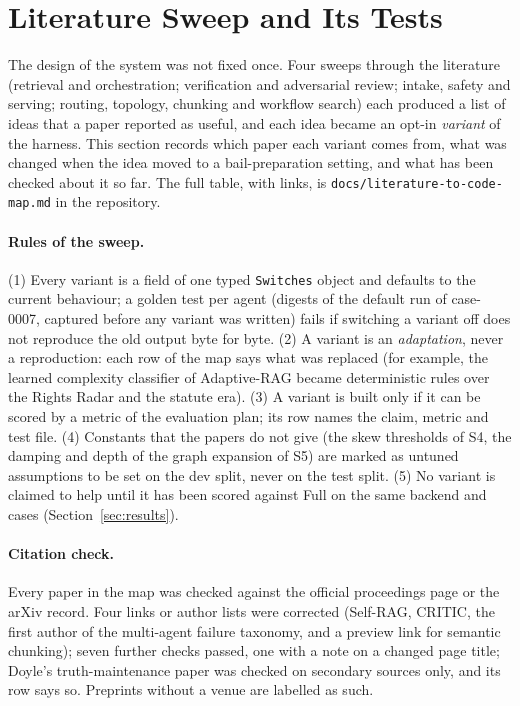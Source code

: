 \section{Literature Sweep and Its Tests}
\label{sec:literature}

The design of the system was not fixed once. Four sweeps through the literature (retrieval and orchestration; verification and adversarial review; intake, safety and serving; routing, topology, chunking and workflow search) each produced a list of ideas that a paper reported as useful, and each idea became an opt-in \emph{variant} of the harness. This section records which paper each variant comes from, what was changed when the idea moved to a bail-preparation setting, and what has been checked about it so far. The full table, with links, is \texttt{docs/literature-to-code-map.md} in the repository.

\paragraph{Rules of the sweep.} (1) Every variant is a field of one typed \texttt{Switches} object and defaults to the current behaviour; a golden test per agent (digests of the default run of case-0007, captured before any variant was written) fails if switching a variant off does not reproduce the old output byte for byte. (2) A variant is an \emph{adaptation}, never a reproduction: each row of the map says what was replaced (for example, the learned complexity classifier of Adaptive-RAG became deterministic rules over the Rights Radar and the statute era). (3) A variant is built only if it can be scored by a metric of the evaluation plan; its row names the claim, metric and test file. (4) Constants that the papers do not give (the skew thresholds of S4, the damping and depth of the graph expansion of S5) are marked as untuned assumptions to be set on the dev split, never on the test split. (5) No variant is claimed to help until it has been scored against Full on the same backend and cases (Section~\ref{sec:results}).

\paragraph{Citation check.} Every paper in the map was checked against the official proceedings page or the arXiv record. Four links or author lists were corrected (Self-RAG, CRITIC, the first author of the multi-agent failure taxonomy, and a preview link for semantic chunking); seven further checks passed, one with a note on a changed page title; Doyle's truth-maintenance paper was checked on secondary sources only, and its row says so. Preprints without a venue are labelled as such.

